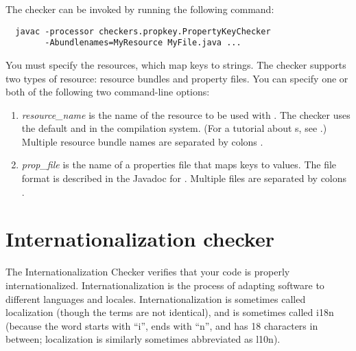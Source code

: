 The checker can be invoked by running the following
command:

\begin{Verbatim}
  javac -processor checkers.propkey.PropertyKeyChecker
        -Abundlenames=MyResource MyFile.java ...
\end{Verbatim}

You must specify the resources, which map keys to strings.
The checker supports two types of resource:
resource bundles and property files.  You can specify one or both of the
following two command-line options:

\begin{enumerate}

\item {}

  \emph{resource\_name} is the name of the resource to be used with
  .
  The checker uses the default  and  in the
  compilation system.
  (For a tutorial about s, see
  .)
  Multiple resource bundle names are separated by colons \code{:}.

\item {}

  \emph{prop\_file} is the name of a properties file that maps
  keys to values.  The file format is described in
  the Javadoc for 
  .
  Multiple files are separated by colons \code{:}.

\end{enumerate}



\section{Internationalization checker\label{i18n-checker}}

The Internationalization Checker verifies that your code is properly
internationalized.  Internationalization is the process of adapting
software to different languages and locales.  Internationalization is
sometimes called localization (though the terms are not
identical), and is sometimes called i18n (because the word starts with ``i'',
ends with ``n'', and has 18 characters in between; localization is similarly
sometimes abbreviated as l10n).

